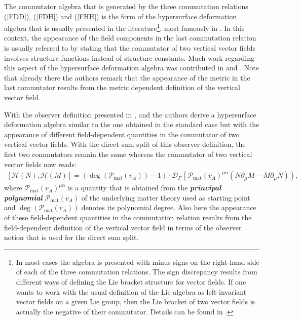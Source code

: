 The commutator algebra that is generated by the three commutation relations (\ref{FDD}), (\ref{FDH}) and (\ref{FHH}) is the form of the hypersurface deformation algebra that is usually presented in the literature\footnote{In most cases the algebra is presented with minus signs on the right-hand side of each of the three commutation relations. The sign discrepancy results from different ways of defining the Lie bracket structure for vector fields. If one wants to work with the usual definition of the Lie algebra as left-invariant vector fields on a given Lie group, then the Lie bracket of two vector fields is actually the negative of their commutator. Details can be found in \cite{1985AnPhy.164..288I}.}, most famously in \cite{HOJMAN197688}. In this context, the appearance of the field components in the last commutation relation is usually referred to by stating that the commutator of two vertical vector fields involves structure functions instead of structure constants. Much work regarding this aspect of the hypersurface deformation algebra was contributed in \cite{1985AnPhy.164..288I} and \cite{1985AnPhy.164..316I}. Note that already there the authors remark that the appearance of the metric in the last commutator results from the metric dependent definition of the vertical vector field. 

With the observer definition presented in \cite{2018PhRvD..97h4036D}, \cite{2011PhRvD..83d4047R} and \cite{Rivera} the authors derive a hypersurface deformation algebra similar to the one obtained in the standard case but with the appearance of different field-dependent quantities in the commutator of two vertical vector fields. With the direct sum split of this observer definition, the first two commutators remain the same whereas the commutator of two vertical vector fields now reads:
\begin{align}\label{PolyAlg}
    \left[\mathcal{H}(N), \mathcal{H}(M) \right] = \left(\operatorname{deg}(\mathcal{P}_{\text{mat}}(v_A)) -1\right ) \cdot  \mathcal{D}_F\left(\mathcal{P}_{\text{mat}}(v_A)^{\mu \alpha}( N\partial_{\mu} M - M \partial_{\mu}N  ) \right),
\end{align}
where $\mathcal{P}_{\text{mat}}(v_A)^{\mu \alpha}$ is a quantity that is obtained from the \textit{\textbf{principal polynomial}} $\mathcal{P}_{\text{mat}}(v_A)$ of the underlying matter theory used as starting point and $\operatorname{deg}(\mathcal{P}_{\text{mat}}(v_A))$ denotes its polynomial degree. Also here the appearance of these field-dependent quantities in the commutation relation results from the field-dependent definition of the vertical vector field in terms of the observer notion that is used for the direct sum split.
